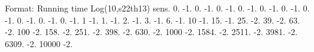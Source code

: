 Format\+: Running time Log(10,s22th13) sens. 0. -\/1. 0. -\/1. 0. -\/1. 0. -\/1. 0. -\/1. 0. -\/1. 0. -\/1. 0. -\/1. 0. -\/1. 0. -\/1. 1 -\/1. 1. -\/1. 2. -\/1. 3. -\/1. 6. -\/1. 10 -\/1. 15. -\/1. 25. -\/2. 39. -\/2. 63. -\/2. 100 -\/2. 158. -\/2. 251. -\/2. 398. -\/2. 630. -\/2. 1000 -\/2. 1584. -\/2. 2511. -\/2. 3981. -\/2. 6309. -\/2. 10000 -\/2. 